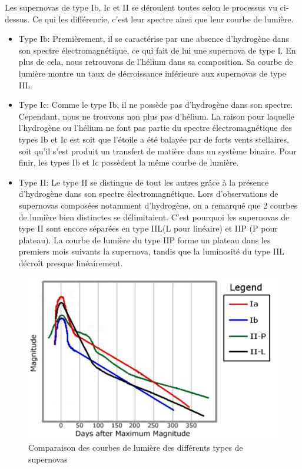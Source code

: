 Les supernovas de type Ib, Ic et II se déroulent toutes selon le processus vu ci-dessus. Ce qui les différencie, c'est leur spectre ainsi que leur courbe de lumière.\bigskip

\begin{itemize}
	
	\item Type Ib: Premièrement, il se caractérise par une absence d'hydrogène dans son spectre électromagnétique, ce qui fait de lui une supernova de type I. En plus de cela, nous retrouvons de l'hélium dans sa composition. Sa courbe de lumière montre un taux de décroissance inférieure aux supernovas de type IIL.
	
	\item Type Ic: Comme le type Ib, il ne possède pas d'hydrogène dans son spectre. Cependant, nous ne trouvons non plus pas d'hélium. La raison pour laquelle l'hydrogène ou l'hélium ne font pas partie du spectre électromagnétique des types Ib et Ic est soit que l'étoile a été balayée par de forts vents stellaires, soit qu'il s'est produit un transfert de matière dans un système binaire. Pour finir, les types Ib et Ic possèdent la même courbe de lumière.
	
	\item Type II: Le type II se distingue de tout les autres grâce à la présence d'hydrogène dans son spectre électromagnétique. Lors d'observations de supernovas composées notamment d'hydrogène, on a remarqué que 2 courbes de lumière bien distinctes se délimitaient. C'est pourquoi les supernovas de type II sont encore séparées en type IIL(L pour linéaire) et IIP (P pour plateau). La courbe de lumière du type IIP forme un plateau dans les premiers mois suivants la supernova, tandis que la luminosité du type IIL décroît presque linéairement.
	
\end{itemize}\newpage


\begin{figure}[H]\vspace{1cm}
	\centering
	\includegraphics[scale=0.4]{images/lightcurves}
	\caption{Comparaison des courbes de lumière des différents types de supernovas}
\end{figure}\bigskip 

